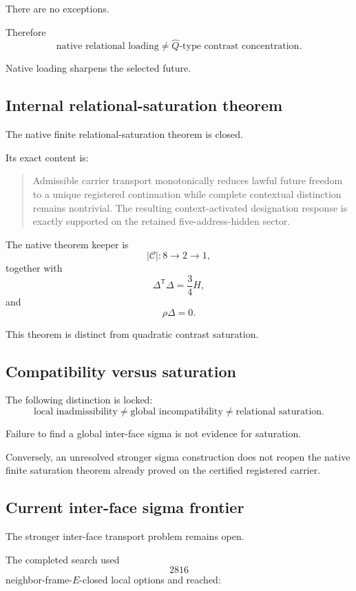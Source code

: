 There are no exceptions.

Therefore
\[
\text{native relational loading}
\neq
\widehat Q\text{-type contrast concentration}.
\]

Native loading sharpens the selected future.

\subsection{Internal relational-saturation theorem}

The native finite relational-saturation theorem is closed.

Its exact content is:

\begin{quote}
Admissible carrier transport monotonically reduces lawful future
freedom to a unique registered continuation while complete contextual
distinction remains nontrivial.  The resulting context-activated
designation response is exactly supported on the retained
five-address-hidden sector.
\end{quote}

The native theorem keeper is
\[
|\mathcal C|:
8\longrightarrow2\longrightarrow1,
\]
together with
\[
\Delta^{\mathsf T}\Delta=\frac34H,
\]
and
\[
\rho\Delta=0.
\]

This theorem is distinct from quadratic contrast saturation.

\subsection{Compatibility versus saturation}

The following distinction is locked:
\[
\text{local inadmissibility}
\neq
\text{global incompatibility}
\neq
\text{relational saturation}.
\]

Failure to find a global inter-face sigma is not evidence for
saturation.

Conversely, an unresolved stronger sigma construction does not reopen
the native finite saturation theorem already proved on the certified
registered carrier.

\subsection{Current inter-face sigma frontier}

The stronger inter-face transport problem remains open.

The completed search used
\[
2816
\]
neighbor-frame-\(E\)-closed local options and reached:


